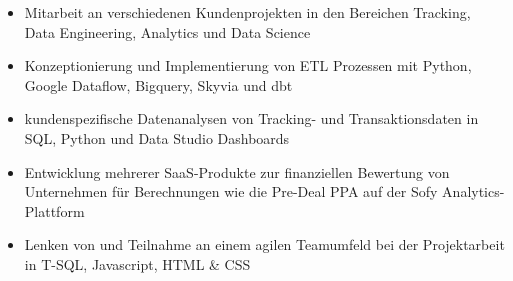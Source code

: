 \documentclass[9pt,a4paper,ragged2e]{altacv}
\begin{document}

    \begin{fullwidth}
        \makecvheader
    \end{fullwidth}




    \begin{itemize}
        \item Mitarbeit an verschiedenen Kundenprojekten in den Bereichen Tracking, Data Engineering, Analytics und Data Science
        \item Konzeptionierung und Implementierung von ETL Prozessen mit Python, Google Dataflow, Bigquery, Skyvia und dbt
        \item kundenspezifische Datenanalysen von Tracking- und Transaktionsdaten in SQL, Python und Data Studio Dashboards
    \end{itemize}

    \divider

    \begin{itemize}
        \item Entwicklung mehrerer SaaS-Produkte zur finanziellen Bewertung von Unternehmen für Berechnungen wie die Pre-Deal PPA auf der Sofy  Analytics-Plattform
        \item Lenken von und Teilnahme an einem agilen Teamumfeld bei der Projektarbeit in T-SQL, Javascript, HTML \& CSS
    \end{itemize}
\end{document}
